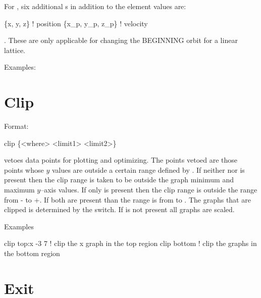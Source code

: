 For , six additional
s in addition to the element values are:
\begin{example}
  \{x, y, z\}           ! position 
  \{x\_p, y\_p, z\_p\}  ! velocity
\end{example}.
These are only applicable for changing the BEGINNING orbit for a linear lattice.

Examples:


\section{Clip}
\label{s:clip}

Format:
\begin{example}
  clip \{<where> <limit1> <limit2>\}
\end{example}

\vskip 0.2in  vetoes data points for plotting and
optimizing. The points vetoed are those points whose $y$ values are
outside a certain range defined by  . If
neither  nor  is present then the clip range
is taken to be outside the graph minimum and maximum $y$--axis
values. If only  is present then the clip range is
outside the range from - to +. If both are
present than the range is from  to .  The
graphs that are clipped is determined by the  switch.  If
 is not present all graphs are scaled.

Examples
\begin{example}
  clip top:x -3  7  ! clip the x graph in the top region
  clip bottom       ! clip the graphs in the bottom region
\end{example}

\section{Exit}
\label{s:exit}

